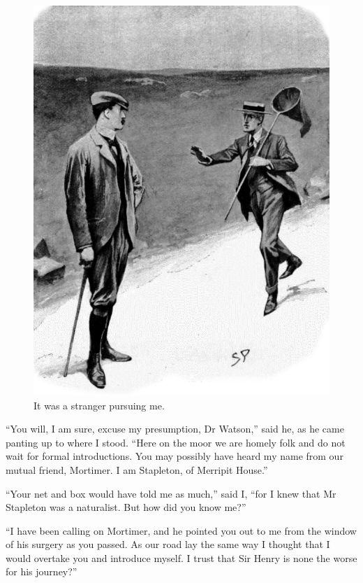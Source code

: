 \documentclass[paper=a5,BCOR=7mm,twoside,DIV=calc,12pt,usegeometry,openany,chapterprefix,endperiod,headings=big]{scrbook} %
\begin{document}
\begin{figure}[tbhp]
\centering
\includegraphics[width=\linewidth]{07_stranger}
\caption{It was a stranger pursuing me.}
\end{figure}

\enquote{You will, I am sure, excuse my presumption, Dr Watson,} said he, as he came panting up to where I stood. \enquote{Here on the moor we are homely folk and do not wait for formal introductions. You may possibly have heard my name from our mutual friend, Mortimer. I am Stapleton, of Merripit House.}

\enquote{Your net and box would have told me as much,} said I, \enquote{for I knew that Mr Stapleton was a naturalist. But how did you know me?}

\enquote{I have been calling on Mortimer, and he pointed you out to me from the window of his surgery as you passed. As our road lay the same way I thought that I would overtake you and introduce myself. I trust that Sir Henry is none the worse for his journey?}
\end{document}
